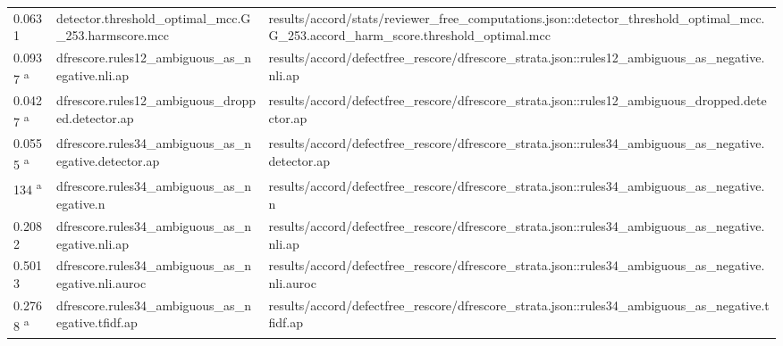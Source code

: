 \begin{longtable}{@{}p{0.7in}p{1.9in}p{2.6in}@{}}
0.0631 & detector.\allowbreak{}threshold\_optimal\_mcc.\allowbreak{}G\_253.\allowbreak{}harmscore.\allowbreak{}mcc & results/\allowbreak{}accord/\allowbreak{}stats/\allowbreak{}reviewer\_free\_computations.\allowbreak{}json::detector\_threshold\_optimal\_mcc.\allowbreak{}G\_253.\allowbreak{}accord\_harm\_score.\allowbreak{}threshold\_optimal.\allowbreak{}mcc\\
0.0937 \textsuperscript{a} & dfrescore.\allowbreak{}rules12\_ambiguous\_as\_negative.\allowbreak{}nli.\allowbreak{}ap & results/\allowbreak{}accord/\allowbreak{}defectfree\_rescore/\allowbreak{}dfrescore\_strata.\allowbreak{}json::rules12\_ambiguous\_as\_negative.\allowbreak{}nli.\allowbreak{}ap\\
0.0427 \textsuperscript{a} & dfrescore.\allowbreak{}rules12\_ambiguous\_dropped.\allowbreak{}detector.\allowbreak{}ap & results/\allowbreak{}accord/\allowbreak{}defectfree\_rescore/\allowbreak{}dfrescore\_strata.\allowbreak{}json::rules12\_ambiguous\_dropped.\allowbreak{}detector.\allowbreak{}ap\\
0.0555 \textsuperscript{a} & dfrescore.\allowbreak{}rules34\_ambiguous\_as\_negative.\allowbreak{}detector.\allowbreak{}ap & results/\allowbreak{}accord/\allowbreak{}defectfree\_rescore/\allowbreak{}dfrescore\_strata.\allowbreak{}json::rules34\_ambiguous\_as\_negative.\allowbreak{}detector.\allowbreak{}ap\\
134 \textsuperscript{a} & dfrescore.\allowbreak{}rules34\_ambiguous\_as\_negative.\allowbreak{}n & results/\allowbreak{}accord/\allowbreak{}defectfree\_rescore/\allowbreak{}dfrescore\_strata.\allowbreak{}json::rules34\_ambiguous\_as\_negative.\allowbreak{}n\\
0.2082 & dfrescore.\allowbreak{}rules34\_ambiguous\_as\_negative.\allowbreak{}nli.\allowbreak{}ap & results/\allowbreak{}accord/\allowbreak{}defectfree\_rescore/\allowbreak{}dfrescore\_strata.\allowbreak{}json::rules34\_ambiguous\_as\_negative.\allowbreak{}nli.\allowbreak{}ap\\
0.5013 & dfrescore.\allowbreak{}rules34\_ambiguous\_as\_negative.\allowbreak{}nli.\allowbreak{}auroc & results/\allowbreak{}accord/\allowbreak{}defectfree\_rescore/\allowbreak{}dfrescore\_strata.\allowbreak{}json::rules34\_ambiguous\_as\_negative.\allowbreak{}nli.\allowbreak{}auroc\\
0.2768 \textsuperscript{a} & dfrescore.\allowbreak{}rules34\_ambiguous\_as\_negative.\allowbreak{}tfidf.\allowbreak{}ap & results/\allowbreak{}accord/\allowbreak{}defectfree\_rescore/\allowbreak{}dfrescore\_strata.\allowbreak{}json::rules34\_ambiguous\_as\_negative.\allowbreak{}tfidf.\allowbreak{}ap\\

\end{longtable}
